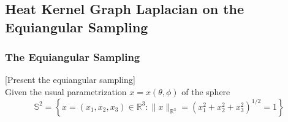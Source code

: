 \subsection{Heat Kernel Graph Laplacian on the Equiangular Sampling}
\label{sec:Chapter3: Heat Kernel Graph Laplacian on the Equiangular Sampling}

\subsubsection{The Equiangular Sampling}
[Present the equiangular sampling]\\
Given the usual parametrization $x = x(\theta, \phi)$ of the sphere
$$
\mathbb{S}^{2}=\left\{x=\left(x_{1}, x_{2}, x_{3}\right) \in \mathbb{R}^{3} :\|x\|_{\mathbb{R}^{3}}=\left(x_{1}^{2}+x_{2}^{2}+x_{3}^{2}\right)^{1 / 2}=1\right\}
$$


